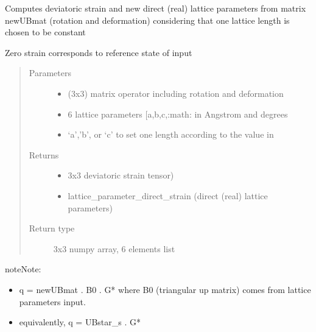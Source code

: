 \documentclass[letterpaper,10pt,english]{sphinxmanual}
\begin{document}
\begin{fulllineitems}
\label{\detokenize{Simulation_Module:LaueTools.CrystalParameters.DeviatoricStrain_LatticeParams}}
Computes deviatoric strain and new direct (real) lattice parameters
from matrix newUBmat (rotation and deformation)
considering that one lattice length is chosen to be constant

Zero strain corresponds to reference state of input 
\begin{quote}\begin{description}
\item[{Parameters}] \leavevmode\begin{itemize}
\item {} 
 \textendash{} (3x3) matrix operator including rotation and deformation

\item {} 
 \textendash{} 6 lattice parameters  {[}a,b,c,:math:\sphinxtitleref{alpha, beta, gamma}{]} in Angstrom and degrees

\item {} 
 \textendash{} ‘a’,’b’, or ‘c’ to set one length according to the value in 

\end{itemize}

\item[{Returns}] \leavevmode
\begin{itemize}
\item {} 
3x3 deviatoric strain tensor)

\item {} 
lattice\_parameter\_direct\_strain (direct (real) lattice parameters)

\end{itemize}


\item[{Return type}] \leavevmode
3x3 numpy array, 6 elements list

\end{description}\end{quote}

\begin{sphinxadmonition}{note}{Note:}\begin{itemize}
\item {} 
q = newUBmat . B0 . G*  where B0 (triangular up matrix) comes from lattice parameters input.

\item {} 
equivalently, q = UBstar\_s . G*

\end{itemize}
\end{sphinxadmonition}

\end{fulllineitems}
\end{document}
